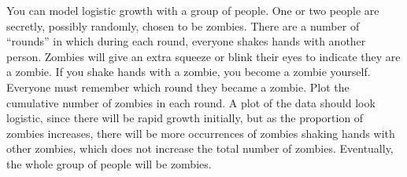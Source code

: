 You can model logistic growth with a group of people. One or two people are secretly, possibly randomly, chosen to be zombies. There are a number of ``rounds'' in which during each round, everyone shakes hands with another person. Zombies will give an extra squeeze or blink their eyes to indicate they are a zombie. If you shake hands with a zombie, you become a zombie yourself. Everyone must remember which round they became a zombie. Plot the cumulative number of zombies in each round. A plot of the data should look logistic, since there will be rapid growth initially, but as the proportion of zombies increases, there will be more occurrences of zombies shaking hands with other zombies, which does not increase the total number of zombies. Eventually, the whole group of people will be zombies.


